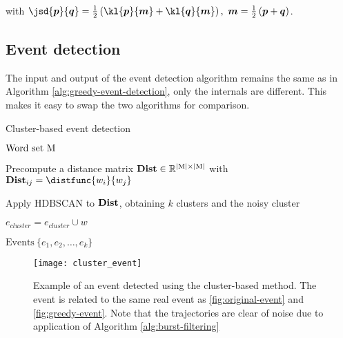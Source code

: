 with $\jsd{\vect{p}}{\vect{q}} = \frac{1}{2} \left( \kl{\vect{p}}{\vect{m}} + \kl{\vect{q}}{\vect{m}} \right) ,\ \vect{m} = \frac{1}{2} \left( \vect{p} + \vect{q} \right)$.


\subsection{Event detection}
The input and output of the event detection algorithm remains the same as in Algorithm \ref{alg:greedy-event-detection}, only the internals are different. This makes it easy to swap the two algorithms for comparison.

\begin{algorithm}[H]
\begin{algorithmic}[1]
\caption{Cluster-based event detection}
\Input $\text{Word set} ~ \text{M}$

\State Precompute a distance matrix $\mathbf{Dist} \in \mathbb{R}^{\left\vert \text{M} \right\vert \times \left\vert \text{M} \right\vert}$ with $\distmat_{ij} = \distfunc{w_{i}}{w_{j}}$

\State Apply HDBSCAN to $\mathbf{Dist}$, obtaining $k$ clusters and the noisy cluster

		\State $e_{cluster} = e_{cluster} \cup w$
	\EndIf
\EndFor

\Output $\text{Events} ~ \{ e_{1}, e_{2}, \dots, e_{k} \}$
\end{algorithmic}
\end{algorithm}


\begin{figure}[H]
  \centering
  \texttt{[image: cluster\_event]}  %
  \caption{Example of an event detected using the cluster-based method. The event is related to the same real event as \autoref{fig:original-event} and \autoref{fig:greedy-event}. Note that the trajectories are clear of noise due to application of Algorithm \ref{alg:burst-filtering}}
  \label{fig:cluster-event}
\end{figure}
